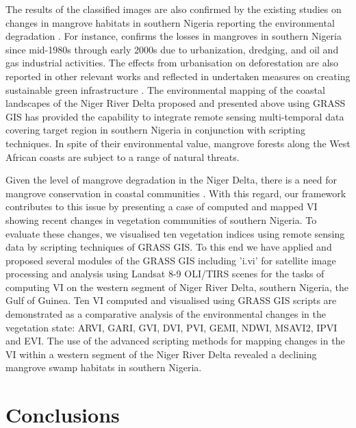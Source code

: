 \documentclass[jmse,article,submit,pdftex,moreauthors]{Definitions/mdpi}
\begin{document}
The results of the classified images are also confirmed by the existing studies on changes in mangrove habitats in southern Nigeria reporting the environmental degradation \cite{BAMIDELE2023103274,TOBORE2022158}. For instance, \cite{Godstime2007} confirms the losses in mangroves in southern Nigeria since mid-1980s through early 2000s due to urbanization, dredging, and oil and gas industrial activities. The effects from urbanisation on deforestation are also reported in other relevant works \cite{AyanladeDrake,su141811289} and reflected in undertaken measures on creating sustainable green infrastructure \cite{ADEGUN2021e01044}. The environmental mapping of the coastal landscapes of the Niger River Delta proposed and presented above using GRASS GIS has provided the capability to integrate remote sensing multi-temporal data covering target region in southern Nigeria in conjunction with scripting techniques. In spite of their environmental value, mangrove forests along the West African coasts are subject to a range of natural threats. 

Given the level of mangrove degradation in the Niger Delta, there is a need for mangrove conservation in coastal communities \cite{ONYENA2020e00961}. With this regard, our framework contributes to this issue by presenting a case of computed and mapped VI showing recent changes in vegetation communities of southern Nigeria. To evaluate these changes, we visualised ten vegetation indices using remote sensing data by scripting techniques of GRASS GIS. To this end we have applied and proposed several modules of the GRASS GIS including 'i.vi' for satellite image processing and analysis using Landsat 8-9 OLI/TIRS scenes for the tasks of computing VI on the western segment of Niger River Delta, southern Nigeria, the Gulf of Guinea. Ten VI computed and visualised using GRASS GIS scripts are demonstrated as a comparative analysis of the environmental changes in the vegetation state: ARVI, GARI, GVI, DVI, PVI, GEMI, NDWI, MSAVI2, IPVI and EVI. The use of the advanced scripting methods for mapping changes in the VI within a western segment of the Niger River Delta revealed a declining mangrove swamp habitats in southern Nigeria. 

\section{Conclusions}
\end{document}
